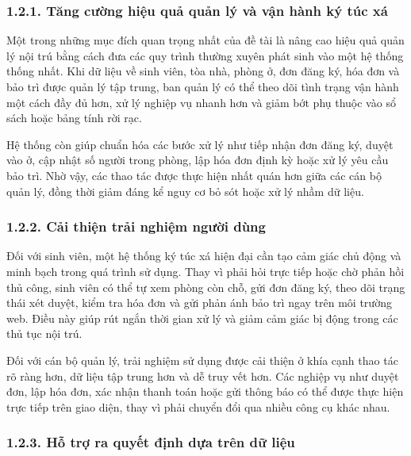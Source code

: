 \documentclass[12pt]{article}
\begin{document}
\subsubsection*{1.2.1. Tăng cường hiệu quả quản lý và vận hành ký túc xá}

Một trong những mục đích quan trọng nhất của đề tài là nâng cao hiệu quả quản lý nội trú bằng cách đưa các quy trình thường xuyên phát sinh vào một hệ thống thống nhất. Khi dữ liệu về sinh viên, tòa nhà, phòng ở, đơn đăng ký, hóa đơn và bảo trì được quản lý tập trung, ban quản lý có thể theo dõi tình trạng vận hành một cách đầy đủ hơn, xử lý nghiệp vụ nhanh hơn và giảm bớt phụ thuộc vào sổ sách hoặc bảng tính rời rạc.

Hệ thống còn giúp chuẩn hóa các bước xử lý như tiếp nhận đơn đăng ký, duyệt vào ở, cập nhật số người trong phòng, lập hóa đơn định kỳ hoặc xử lý yêu cầu bảo trì. Nhờ vậy, các thao tác được thực hiện nhất quán hơn giữa các cán bộ quản lý, đồng thời giảm đáng kể nguy cơ bỏ sót hoặc xử lý nhầm dữ liệu.

\subsubsection*{1.2.2. Cải thiện trải nghiệm người dùng}

Đối với sinh viên, một hệ thống ký túc xá hiện đại cần tạo cảm giác chủ động và minh bạch trong quá trình sử dụng. Thay vì phải hỏi trực tiếp hoặc chờ phản hồi thủ công, sinh viên có thể tự xem phòng còn chỗ, gửi đơn đăng ký, theo dõi trạng thái xét duyệt, kiểm tra hóa đơn và gửi phản ánh bảo trì ngay trên môi trường web. Điều này giúp rút ngắn thời gian xử lý và giảm cảm giác bị động trong các thủ tục nội trú.

Đối với cán bộ quản lý, trải nghiệm sử dụng được cải thiện ở khía cạnh thao tác rõ ràng hơn, dữ liệu tập trung hơn và dễ truy vết hơn. Các nghiệp vụ như duyệt đơn, lập hóa đơn, xác nhận thanh toán hoặc gửi thông báo có thể được thực hiện trực tiếp trên giao diện, thay vì phải chuyển đổi qua nhiều công cụ khác nhau.

\subsubsection*{1.2.3. Hỗ trợ ra quyết định dựa trên dữ liệu}
\end{document}
